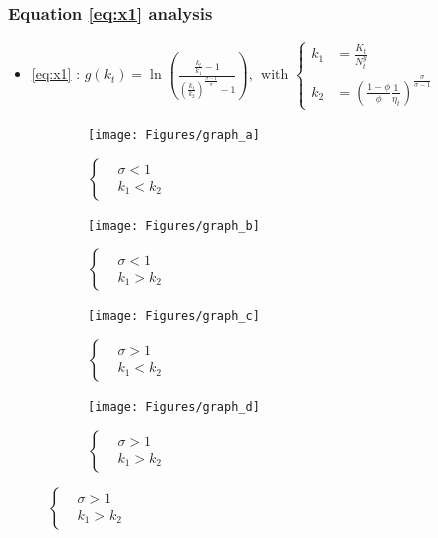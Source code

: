 \documentclass{beamer}
\begin{document}
		\begin{frame}[label = uniqueness]\frametitle{Equation \eqref{eq:x1} analysis}
			\begin{itemize}
				\item \eqref{eq:x1} : $g(k_t) = \ln\left( \frac{\frac{k_t}{k_1}-1}{\left(\frac{k_t}{k_2}\right)^{\frac{\sigma - 1}{\sigma}} - 1} \right), ~~ \text{with }\begin{cases} k_1 &= \frac{K_t}{N_t^y} \\ k_2 &= \left(\frac{1-\phi}{\phi} \frac{1}{\eta_t} \right)^{\frac{\sigma}{\sigma-1}} \end{cases}$
			\end{itemize}
			\begin{figure}[ht]
				\begin{subfigure}[t]{0.24\linewidth}
					\centering
					\texttt{[image: Figures/graph\_a]} 
					\caption{$\begin{cases}
						&\sigma < 1 \\ &k_1 < k_2
						\end{cases}$}
					\label{fig:graph_a}
				\end{subfigure}
				\begin{subfigure}[t]{0.24\linewidth}
					\centering
					\texttt{[image: Figures/graph\_b]} 
					\caption{$\begin{cases}
						&\sigma < 1 \\ &k_1 > k_2
						\end{cases}$} 
					\label{fig:graph_b}
				\end{subfigure}
				\begin{subfigure}[t]{0.24\linewidth}
					\centering
					\texttt{[image: Figures/graph\_c]} 
					\caption{$\begin{cases}
						&\sigma > 1 \\ &k_1 < k_2
						\end{cases}$} 
					\label{fig:graph_c} 
				\end{subfigure}
				\begin{subfigure}[t]{0.24\linewidth}
					\centering
					\texttt{[image: Figures/graph\_d]} 
					\caption{$\begin{cases}
						&\sigma > 1 \\ &k_1 > k_2
						\end{cases}$} 
					\label{fig:graph_d} 
				\end{subfigure}
			\end{figure}
			\hyperlink{captolab<1>}{}
		\end{frame}
\end{document}
